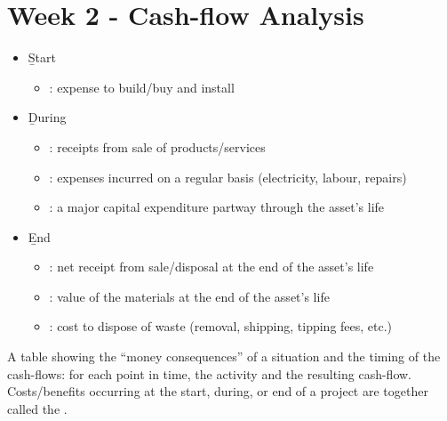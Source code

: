 
\section{Week 2 - Cash-flow Analysis}


\begin{remark}
    \leavevmode
    \begin{itemize}
        \item \b{Start}
        \begin{itemize}
            \item {}: expense to build/buy and install
        \end{itemize}
        \item \b{During}
        \begin{itemize}
            \item {}: receipts from sale of products/services
            \item {}: expenses incurred on a regular basis (electricity, labour, repairs)
            \item {}: a major capital expenditure partway through the asset's life
        \end{itemize}
        \item \b{End}
        \begin{itemize}
            \item {}: net receipt from sale/disposal at the end of the asset's  life
            \item {}: value of the materials at the end of the asset's  life
            \item {}: cost to dispose of waste (removal, shipping, tipping fees, etc.)
        \end{itemize}
    \end{itemize}
\end{remark}

\begin{definition}
    A table showing the ``money consequences'' of a situation and the timing
    of the cash-flows: for each point in time, the activity and the
    resulting cash-flow. Costs/benefits occurring at the start, during, or
    end of a project are together called the .
\end{definition}

